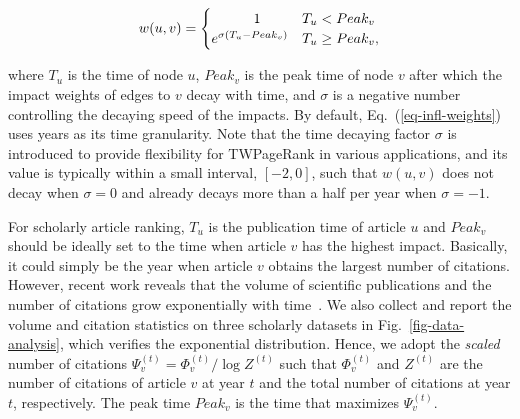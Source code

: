 \vspace{-1ex}
\begin{small}
\begin{equation} \label{eq-infl-weights}
w(u,v)  =  \begin{cases}  \hspace{7ex} 1 & T_u <  Peak_v \\
  e^{\sigma(T_u-Peak_v)} & T_u \geq Peak_v,
\end{cases}
\end{equation}
\end{small}
%
\noindent where $T_u$ is the time of node $u$, $Peak_v$ is the peak time of node $v$ after which the impact weights of edges to $v$ decay with time, and $\sigma$ is a negative number controlling the decaying speed of the impacts.
By default, Eq.~(\ref{eq-infl-weights}) uses years as its time granularity. Note that the time decaying factor $\sigma$ is introduced to provide flexibility for TWPageRank in various applications, and its value is typically within a small interval, \eg $[-2,0]$, such that $w(u,v)$ does not decay when $\sigma=0$ and already decays more than a half per year when $\sigma=-1$.


For scholarly article ranking, $T_u$ is the publication time of article $u$ and $Peak_v$ should be ideally set to the time when article $v$ has the highest impact. Basically, it could simply be the year when article $v$ obtains the largest number of citations. However, recent work reveals that the volume of scientific publications and the number of citations grow exponentially with time~\cite{Dong2017KDD,BornmannM15}. We also collect and report the volume and citation statistics on three scholarly datasets in Fig.~\ref{fig-data-analysis}, which verifies the exponential distribution. Hence, we adopt the {\em scaled} number of citations $\Psi_v^{(t)}=\Phi_v^{(t)} / \log Z^{(t)}$ such that $\Phi_v^{(t)}$ and $Z^{(t)}$ are the number of citations of article $v$ at year $t$ and the total number of citations at year $t$, respectively. The peak time $Peak_v$ is the time that maximizes $\Psi_v^{(t)}$.



